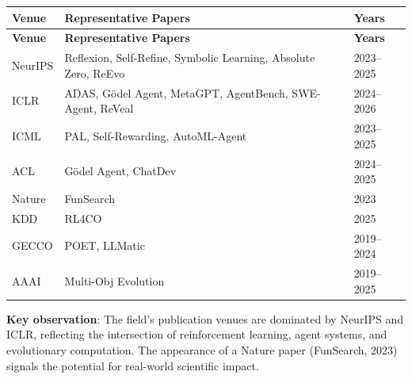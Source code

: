 \begin{longtable}{p{25mm}p{45mm}p{18mm}}
\toprule
\textbf{Venue} & \textbf{Representative Papers} & \textbf{Years} \\
\midrule
\endfirsthead
\toprule
\textbf{Venue} & \textbf{Representative Papers} & \textbf{Years} \\
\midrule
\endhead

NeurIPS & Reflexion, Self-Refine, Symbolic Learning, Absolute Zero, ReEvo & 2023--2025 \\
ICLR & ADAS, G\"{o}del Agent, MetaGPT, AgentBench, SWE-Agent, ReVeal & 2024--2026 \\
ICML & PAL, Self-Rewarding, AutoML-Agent & 2023--2025 \\
ACL & G\"{o}del Agent, ChatDev & 2024--2025 \\
Nature & FunSearch & 2023 \\
KDD & RL4CO & 2025 \\
GECCO & POET, LLMatic & 2019--2024 \\
AAAI & Multi-Obj Evolution & 2019--2025 \\
\bottomrule
\end{longtable}

\textbf{Key observation}: The field's publication venues are dominated by NeurIPS and ICLR, reflecting the intersection of reinforcement learning, agent systems, and evolutionary computation. The appearance of a Nature paper (FunSearch, 2023) signals the potential for real-world scientific impact.
